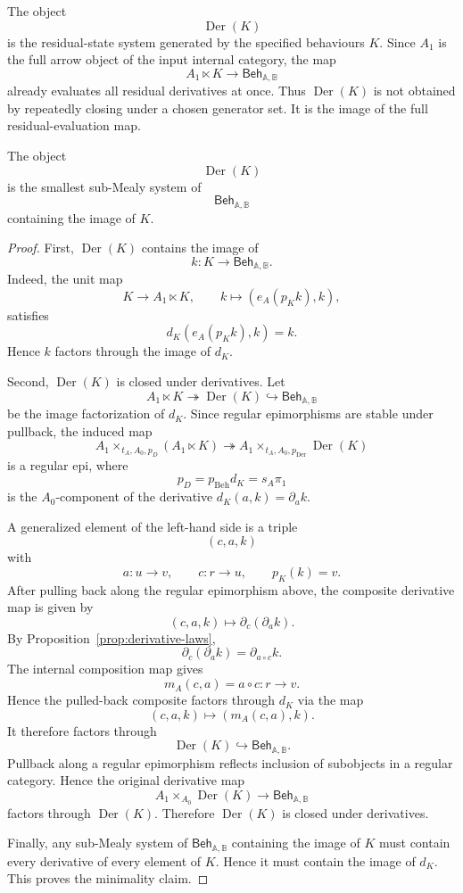 \begin{remark}
\label{rem:derivative-closure-as-residual-realization}
The object
\[
\operatorname{Der}(K)
\]
is the residual-state system generated by the specified behaviours \(K\).
Since \(A_1\) is the full arrow object of the input internal category, the map
\[
A_1\ltimes K\to\mathsf{Beh}_{\mathbb A,\mathbb B}
\]
already evaluates all residual derivatives at once. Thus
\(\operatorname{Der}(K)\) is not obtained by repeatedly closing under a chosen
generator set. It is the image of the full residual-evaluation map.
\end{remark}

\begin{theorem}
\label{thm:derivative-closure}
The object
\[
\operatorname{Der}(K)
\]
is the smallest sub-Mealy system of
\[
\mathsf{Beh}_{\mathbb A,\mathbb B}
\]
containing the image of \(K\).
\end{theorem}

\begin{proof}
First, \(\operatorname{Der}(K)\) contains the image of
\[
k:K\to\mathsf{Beh}_{\mathbb A,\mathbb B}.
\]
Indeed, the unit map
\[
K\to A_1\ltimes K,
\qquad
k\longmapsto (e_A(p_Kk),k),
\]
satisfies
\[
d_K(e_A(p_Kk),k)=k.
\]
Hence \(k\) factors through the image of \(d_K\).

Second, \(\operatorname{Der}(K)\) is closed under derivatives. Let
\[
A_1\ltimes K
\twoheadrightarrow
\operatorname{Der}(K)
\hookrightarrow
\mathsf{Beh}_{\mathbb A,\mathbb B}
\]
be the image factorization of \(d_K\). Since regular epimorphisms are stable
under pullback, the induced map
\[
A_1\times_{t_A,A_0,p_D}(A_1\ltimes K)
\twoheadrightarrow
A_1\times_{t_A,A_0,p_{\operatorname{Der}}}
\operatorname{Der}(K)
\]
is a regular epi, where
\[
p_D
=
p_{\mathrm{Beh}}d_K
=
s_A\pi_1
\]
is the \(A_0\)-component of the derivative \(d_K(a,k)=\partial_a k\).

A generalized element of the left-hand side is a triple
\[
(c,a,k)
\]
with
\[
a:u\to v,
\qquad
c:r\to u,
\qquad
p_K(k)=v.
\]
After pulling back along the regular epimorphism above, the composite
derivative map is given by
\[
(c,a,k)\longmapsto \partial_c(\partial_a k).
\]
By Proposition~\ref{prop:derivative-laws},
\[
\partial_c(\partial_a k)
=
\partial_{a\circ c}k.
\]
The internal composition map gives
\[
m_A(c,a)=a\circ c:r\to v.
\]
Hence the pulled-back composite factors through \(d_K\) via the map
\[
(c,a,k)\longmapsto (m_A(c,a),k).
\]
It therefore factors through
\[
\operatorname{Der}(K)\hookrightarrow\mathsf{Beh}_{\mathbb A,\mathbb B}.
\]
Pullback along a regular epimorphism reflects inclusion of subobjects in a
regular category. Hence the original derivative map
\[
A_1\times_{A_0}\operatorname{Der}(K)
\to
\mathsf{Beh}_{\mathbb A,\mathbb B}
\]
factors through \(\operatorname{Der}(K)\). Therefore
\(\operatorname{Der}(K)\) is closed under derivatives.

Finally, any sub-Mealy system of \(\mathsf{Beh}_{\mathbb A,\mathbb B}\)
containing the image of \(K\) must contain every derivative of every element
of \(K\). Hence it must contain the image of \(d_K\). This proves the
minimality claim.
\end{proof}

